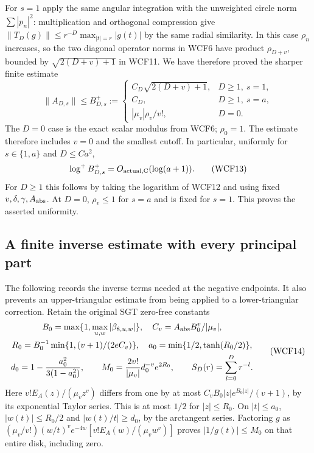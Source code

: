 For $s=1$ apply the same angular integration with the unweighted
circle norm $\sum|p_n|^2$: multiplication and orthogonal compression
give $\|T_D(g)\|\le r^{-D}\max_{|t|=r}|g(t)|$ by the same radial
similarity. In this case $\rho_n$ increases, so the two diagonal
operator norms in WCF6 have product $\rho_{D+v}$, bounded by
$\sqrt{2(D+v)+1}$ in WCF11. We have therefore proved the sharper
finite estimate
\[
 \boxed{\quad \|A_{D,s}\|\le B^+_{D,s}:=
 \begin{cases}
 C_D\sqrt{2(D+v)+1},&D\ge1,\ s=1,\\
 C_D,&D\ge1,\ s=a,\\
 |\mu_v|\rho_v/v!,&D=0.
 \end{cases}\quad}
 \tag{WCF12}
\]
The $D=0$ case is the exact scalar modulus from WCF6; $\rho_0=1$.
The estimate therefore includes $v=0$ and the smallest cutoff.
In particular, uniformly for $s\in\{1,a\}$ and $D\le C a^2$,
\[
 \log^+B^+_{D,s}=O_{\rm actual,C}(\log(a+1)).
 \tag{WCF13}
\]
For $D\ge1$ this follows by taking the logarithm of WCF12 and
using fixed $v,\delta,\gamma,A_{\rm abs}$. At $D=0$, $\rho_v\le1$
for $s=a$ and is fixed for $s=1$. This proves the asserted uniformity.

\subsection{A finite inverse estimate with every principal part}

The following records the inverse terms needed at the negative endpoints.
It also prevents an upper-triangular estimate from being applied to a
lower-triangular correction. Retain the original SGT zero-free constants
\[
\begin{gathered}
 B_0=\max\{1,\max_{u,w}|\beta_{8,u,w}|\},\quad
 C_v=A_{\rm abs}B_0^v/|\mu_v|,\\
 R_0=B_0^{-1}\min\{1,(v+1)/(2eC_v)\},\quad
 a_0=\min\{1/2,\tanh(R_0/2)\},\\
 d_0=1-\frac{a_0^2}{3(1-a_0^2)},\qquad
 M_0=\frac{2v!}{|\mu_v|}d_0^{-v}e^{2R_0},\qquad
 S_D(r)=\sum_{l=0}^D r^{-l}.
\end{gathered}\tag{WCF14}
\]
Here $v!E_A(z)/(\mu_vz^v)$ differs from one by at most
$C_vB_0|z|e^{B_0|z|}/(v+1)$, by its exponential Taylor series.
This is at most $1/2$ for $|z|\le R_0$. On $|t|\le a_0$,
$|w(t)|\le R_0/2$ and $|w(t)/t|\ge d_0$, by the arctangent
series. Factoring $g$ as
$(\mu_v/v!)(w/t)^ve^{-4w}[v!E_A(w)/(\mu_vw^v)]$ proves
$|1/g(t)|\le M_0$ on that entire disk, including zero.

